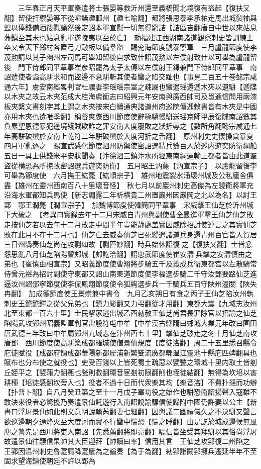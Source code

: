 　　三年春正月天平軍奏遣將士張晏等救沂州還至義橋聞北境復有盜起【復扶又翻】留使扞禦晏等不從喧譟趣鄆州【趣七喻翻】都將張思泰李承祐走馬出城裂袖與盟以俸錢備酒殽慰諭然後定詔本軍宣慰一切無得窮詰【詰區吉翻唐自中世以來姑息藩鎮至其末也姑息亂軍遂陵夷以至於亡】　勑福建江西湖南諸道觀察刺史皆訓練士卒又令天下鄉村各置弓刀皷板以備羣盜　賜兖海節度號泰寧軍　三月盧龍節度使李茂勲請以其子幽州左司馬可舉知留後自求致仕詔茂勲以左僕射致仕以可舉為盧龍留後　門下侍郎同平章事崔彦昭罷為太子太傅以左僕射王鐸兼門下侍郎同平章事　南詔遣使者詣高駢求和而盜邊不息駢斬其使者蠻之陷交趾也【事見二百五十卷懿宗咸通六年】虜安南經畧判官杜驤妻李瑶瑶宗室之疎屬也蠻遣瑶還遞木夾以遺駢【遞牒以木夾之故云木夾范成大桂海虞衡志曰紹興元年安南與廣西帥司及邕通信問用兩漆板夾繫文書刻字其上謂之木夾按宋白續通典諸道州府巡院傳逓敕書皆有木夾是中國亦用木夾也遺唯季翻】稱督爽牒西川節度使辭極驕慢駢送瑶京師甲辰復牒南詔數其負累聖恩德暴犯邊境殘賊欺詐之罪安南大度覆敗之狀折辱之【數所角翻懿宗咸通七年高駢破蠻於安南上乾符二年駢破蠻於大度河折之舌翻】　原州刺史史懷操貪暴夏四月軍亂逐之　賜宣武感化節度泗州防禦使密詔選精兵數百人於巡内遊奕防衛綱船五日一具上供錢米平安狀聞奏【汴徐泗三鎮汴水所經東南綱運輸上都者皆由此道羣盜從横恐為所掠故密詔選兵遊奕防衛】　五月昭王汭薨【汭宣宗子】　以盧龍留後李可舉為節度使　六月撫王紘薨【紘順宗子】　雄州地震裂水涌壞州城及公私廬舍俱盡【雄州在靈州西南百八十里壞音怪】　秋七月以前巖州刺史高傑為左驍衛將軍充沿海水軍都知兵馬使【新志調露二年析横貴二州置巖州因巖岡之北以為名】以討王郢　鄂王潤薨【潤宣宗子】　加魏博節度使韓簡同平章事　宋威擊王仙芝於沂州城下大破之　【考異曰實録去年十二月宋威自青州與副使曹全晸進軍擊王仙芝仙芝敗走按仙芝若以去年十二月敗走中間半年豈能静處盖實因威除招討使連言之其實仙芝敗在此月不在十二月也】仙芝亡去威奏仙芝已死縱遣諸道兵身還青州百官皆入賀居三日州縣奏仙芝尚在攻剽如故【剽匹妙翻】時兵始休詔復之【復扶又翻】士皆忿怨思亂八月仙芝陷陽翟郟城【郟訖洽翻】詔忠武節度使崔安濳兵擊之安濳慎由之弟也【崔慎由相宣宗】又昭義節度使曹翔將步騎五千及義成兵衛東都宫以左散騎常侍曾元裕為招討副使守東都又詔山南東道節度使李福選步騎二千守汝鄧要路仙芝進逼汝州詔邠寧節度使李侃鳳翔節度使令狐綯選步兵一千騎兵五百守陜州潼關【陜失冉翻】　加成德節度使王景崇兼中書令　九月乙亥朔日有食之丙子王仙芝陷汝州執刺史王鐐鐐鐸之從父兄弟也【鐐力彫翻又力弔翻從才用翻】東都大震【九域志汝州北至東都一百六十里】士民挈家逃出城乙酉勑赦王仙芝尚君長罪除官以招諭之仙芝陷陽武攻鄭州昭義監軍判官雷殷符屯中牟【中牟漢古縣隋曰郟城大業元年改曰圃田唐武德三年改曰中牟屬鄭州九域志在汴州西七十里】擊仙芝破走之冬十月仙芝南攻唐鄧　西川節度使高駢築成都羅城使僧景仙規度【度徒洛翻】周二十五里悉召縣令庀徒賦役【成都府領成都華陽新都犀浦新繁雙流廣都郫温江靈池十縣庀匹婢翻具也賦布也分布使之就役也】吏受百錢以上皆死蜀土疏惡以甓甃之環城十里内取土皆剗丘姪平之【甓蒲力翻甎也甃則救翻環音宦剗初限翻削也垤徒結翻】無得為坎埳以害耕種【埳徒感翻坎旁入也】役者不過十日而代衆樂其均【樂音洛】不費扑撻而功辦【扑普卜翻】自八月癸丑築之至十一月戊子畢功役之始作也駢恐南詔揚聲入寇雖不敢決來役者必驚擾乃奏遣景仙託遊行入南詔說諭驃信使歸附中國仍許妻以公主【新書曰浮屠景仙如此則文意明說輸芮翻妻七細翻】因與議二國禮儀久之不決駢又聲言欲巡邊朝夕通烽火至大度河而實不行蠻中惴恐【惴之睡翻】由是訖於城成邊候無風塵之警先是西川將吏入南詔【先悉薦翻將即亮翻】驃信皆坐受其拜駢以其俗尚浮屠故遣景仙往驃信果帥其大臣迎拜【帥讀曰率】信用其言　王仙芝攻郢復二州陷之　王郢因温州刺史魯寔請降寔屢為之論奏【為于為翻】勑郢詣闕郢擁兵遷延半年不至固求望海鎮使朝廷不許以郢為